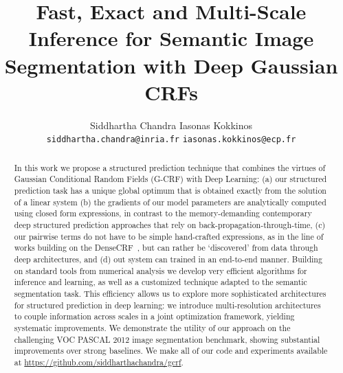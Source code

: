 \documentclass[runningheads]{llncs}
\begin{document}
\pagestyle{headings}
\mainmatter


\title{Fast, Exact and Multi-Scale Inference for Semantic Image Segmentation with Deep Gaussian CRFs}
\captionsetup[subfigure]{labelformat=empty}
\author{Siddhartha Chandra \hfill Iasonas Kokkinos\\
{\tt \small siddhartha.chandra@inria.fr} \hfill {\tt \small iasonas.kokkinos@ecp.fr}
}

\maketitle


\begin{abstract}
	In this work we propose a structured prediction technique that combines the virtues of Gaussian Conditional Random Fields (G-CRF)
	with Deep Learning:
	(a) our structured prediction task has a unique  global optimum that is obtained exactly from the solution of a linear system 
	(b) the gradients of our model parameters 
	are analytically computed using closed form expressions, in contrast to the memory-demanding
	contemporary deep structured prediction approaches \cite{crfrnn,Vemulapalli_2016_CVPR} that rely on back-propagation-through-time,
	(c) our pairwise terms do not have to be simple hand-crafted expressions, 
	as in the line of works building on the DenseCRF~\cite{crfrnn,deeplab1}, but can rather be `discovered' from data through deep 
	architectures, and 
	(d) out system can trained in an end-to-end manner. 
	Building on standard tools from numerical analysis we develop very efficient algorithms for inference and learning,
	as well as a customized technique adapted to the semantic segmentation task. 
	This efficiency allows us to explore more sophisticated architectures for structured prediction in deep learning: 
	we introduce multi-resolution architectures to couple information across scales in a joint optimization framework, yielding systematic improvements. 
	We demonstrate the utility of our approach on the challenging VOC PASCAL 2012 image segmentation benchmark, 
	showing substantial improvements over strong baselines. We make all of our code and experiments available at \url{https://github.com/siddharthachandra/gcrf}.
\end{abstract}
\end{document}
